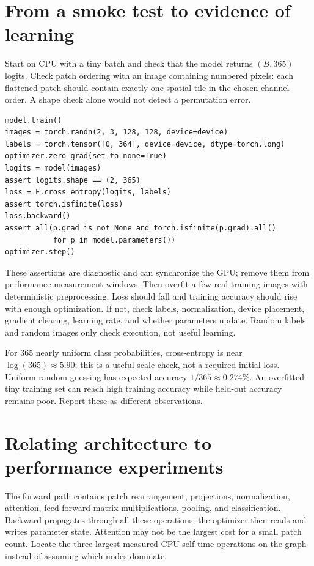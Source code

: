 \documentclass[11pt,a4paper,oneside]{report}
\begin{document}
\newpage
\section{From a smoke test to evidence of learning}
Start on CPU with a tiny batch and check that the model returns $(B,365)$
logits. Check patch ordering with an image containing numbered pixels: each
flattened patch should contain exactly one spatial tile in the chosen channel
order. A shape check alone would not detect a permutation error.

\begin{lstlisting}[style=python]
model.train()
images = torch.randn(2, 3, 128, 128, device=device)
labels = torch.tensor([0, 364], device=device, dtype=torch.long)
optimizer.zero_grad(set_to_none=True)
logits = model(images)
assert logits.shape == (2, 365)
loss = F.cross_entropy(logits, labels)
assert torch.isfinite(loss)
loss.backward()
assert all(p.grad is not None and torch.isfinite(p.grad).all()
           for p in model.parameters())
optimizer.step()
\end{lstlisting}

These assertions are diagnostic and can synchronize the GPU; remove them
from performance measurement windows. Then overfit a few real training images
with deterministic preprocessing. Loss should fall and training accuracy should
rise with enough optimization. If not, check labels, normalization, device
placement, gradient clearing, learning rate, and whether parameters update.
Random labels and random images only check execution, not useful learning.

For 365 nearly uniform class probabilities, cross-entropy is near
$\log(365)\approx5.90$; this is a useful scale check, not a required initial
loss. Uniform random guessing has expected accuracy $1/365\approx0.274\%$.
An overfitted tiny training set can reach high training accuracy while
held-out accuracy remains poor. Report these as different observations.

\section{Relating architecture to performance experiments}
The forward path contains patch rearrangement, projections, normalization,
attention, feed-forward matrix multiplications, pooling, and classification.
Backward propagates through all these operations; the optimizer then reads
and writes parameter state. Attention may not be the largest cost for a small
patch count. Locate the three largest measured CPU self-time operations on
the graph instead of assuming which nodes dominate.
\end{document}
